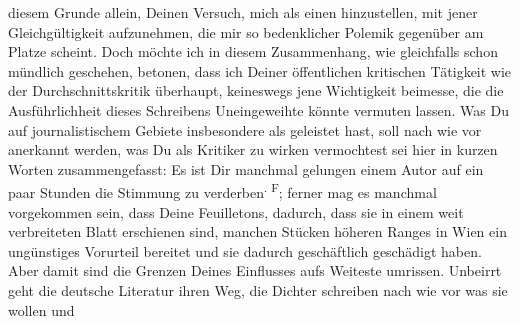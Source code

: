                diesem Grunde allein, Deinen Versuch, mich als einen \label{K_L03521-9v}\label{K_L03521-9} hinzustellen, mit jener Gleichgültigkeit aufzunehmen, die mir so bedenklicher
               Polemik gegenüber am Platze scheint. Doch möchte ich in diesem Zusammenhang, wie
               gleichfalls schon mündlich geschehen, betonen, dass ich Deiner öffentlichen
               kritischen Tätigkeit wie der Durchschnittskritik überhaupt, keineswegs jene
               Wichtigkeit beimesse, die die Ausführlichheit dieses Schreibens Uneingeweihte könnte
               vermuten lassen. Was Du auf journalistischem Gebiete insbesondere als \label{K_L03521-10v}\label{K_L03521-10}
               geleistet hast, soll nach wie vor anerkannt werden, was Du als Kritiker zu wirken
               vermochtest sei hier in kurzen Worten zusammengefasst: Es ist Dir manchmal gelungen
               einem Autor auf ein paar Stunden die Stimmung zu verderben\substVorne{}\textsuperscript{. F}\substDazwischen{}; f\substHinten{}erner mag es manchmal vorgekommen sein, dass Deine Feuilletons, dadurch, dass
               sie in einem weit verbreiteten Blatt erschienen sind, manchen Stücken höheren Ranges in Wien ein ungünstiges Vorurteil bereitet und sie dadurch
               geschäftlich geschädigt haben. Aber {\pb}damit sind die Grenzen Deines Einflusses aufs Weiteste umrissen. Unbeirrt geht die
               deutsche Literatur ihren Weg, die Dichter schreiben nach wie vor was sie wollen und
